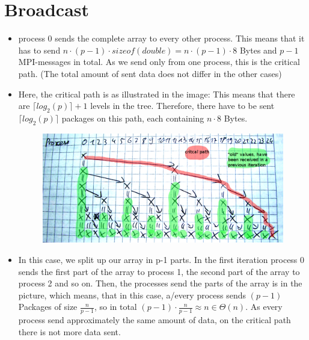 \documentclass[a4paper,10pt]{article}
\begin{document}
\section{Broadcast}
\begin{itemize}
 \item process 0 sends the complete array to every other process. This means that it has to send $n \cdot (p-1) \cdot sizeof(double) = n \cdot (p-1) \cdot 8$ Bytes and $p-1$ MPI-messages in total. As we send only from one process, this is the critical path. (The total amount of sent data does not differ in the other cases)
 \item Here, the critical path is as illustrated in the image: This means that there are $\lceil log_2(p) \rceil + 1$ levels in the tree. Therefore, there have to be sent  $\lceil log_2(p) \rceil$ packages on this path, each containing $n \cdot 8$ Bytes.
\begin{figure}[h!]
 \centering
 \includegraphics[width=0.9 \textwidth]{09/tree_critical_path.png}
\end{figure}

 \item In this case, we split up our array in p-1 parts. In the first iteration process 0 sends the first part of the array to process 1, the second part of the array to process 2 and so on. Then, the processes send the parts of the array is in the picture, which means, that in this case, a/every process sends $(p-1)$ Packages of size $\frac{n}{p-1}$, so in total $(p-1) \cdot \frac{n}{p-1} \approx n \in \varTheta(n)$. As every process send approximately the same amount of data, on the critical path there is not more data sent. 


\end{itemize}
\end{document}
